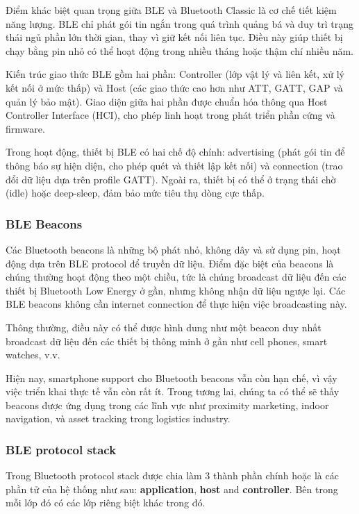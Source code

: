 Điểm khác biệt quan trọng giữa BLE và Bluetooth Classic là cơ chế tiết kiệm năng lượng. BLE chỉ phát gói tin ngắn trong quá trình quảng bá và duy trì trạng thái ngủ phần lớn thời gian, thay vì giữ kết nối liên tục. Điều này giúp thiết bị chạy bằng pin nhỏ có thể hoạt động trong nhiều tháng hoặc thậm chí nhiều năm.

Kiến trúc giao thức BLE gồm hai phần: Controller (lớp vật lý và liên kết, xử lý kết nối ở mức thấp) và Host (các giao thức cao hơn như ATT, GATT, GAP và quản lý bảo mật). Giao diện giữa hai phần được chuẩn hóa thông qua Host Controller Interface (HCI), cho phép linh hoạt trong phát triển phần cứng và firmware.

Trong hoạt động, thiết bị BLE có hai chế độ chính: advertising (phát gói tin để thông báo sự hiện diện, cho phép quét và thiết lập kết nối) và connection (trao đổi dữ liệu dựa trên profile GATT). Ngoài ra, thiết bị có thể ở trạng thái chờ (idle) hoặc deep-sleep, đảm bảo mức tiêu thụ dòng cực thấp.
\subsubsection{BLE Beacons}

Các Bluetooth beacons là những bộ phát nhỏ, không dây và sử dụng pin, hoạt động dựa trên BLE protocol để truyền dữ liệu. Điểm đặc biệt của beacons là chúng thường hoạt động theo một chiều, tức là chúng broadcast dữ liệu đến các thiết bị Bluetooth Low Energy ở gần, nhưng không nhận dữ liệu ngược lại. Các BLE beacons không cần internet connection để thực hiện việc broadcasting này\cite{Afaneh2022BLEGuide}.

Thông thường, điều này có thể được hình dung như một beacon duy nhất broadcast dữ liệu đến các thiết bị thông minh ở gần như cell phones, smart watches, v.v.

Hiện nay, smartphone support cho Bluetooth beacons vẫn còn hạn chế, vì vậy việc triển khai thực tế vẫn còn rất ít. Trong tương lai, chúng ta có thể sẽ thấy beacons được ứng dụng trong các lĩnh vực như proximity marketing, indoor navigation, và asset tracking trong logistics industry.

\subsubsection{BLE protocol stack}

Trong Bluetooth protocol stack được chia làm 3 thành phần chính hoặc là các phần tử của hệ thống như sau: \textbf{application}, \textbf{host} and \textbf{controller}. Bên trong mỗi lớp đó có các lớp riêng biệt khác trong đó.


